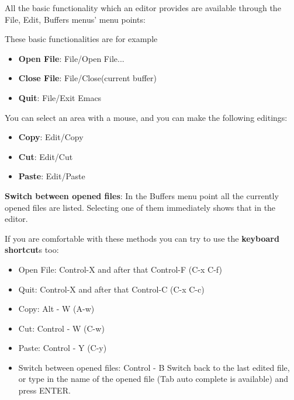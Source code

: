 \documentclass[12pt]{article}
\begin{document}
All the basic functionality which an editor provides are available through
the File, Edit, Buffers menus' menu points:

These basic functionalities are for example
\begin{itemize}
	\item {\bf Open File}: File/Open File...
	\item {\bf Close File}: File/Close(current buffer)
	\item {\bf Quit}: File/Exit Emacs
\end{itemize}


You can select an area with a mouse, and you can make the following editings:
\begin{itemize}
	\item {\bf Copy}: Edit/Copy
	\item {\bf Cut}: Edit/Cut
	\item {\bf Paste}: Edit/Paste
\end{itemize}

{\bf Switch between opened files}: In the Buffers menu point all the currently 
 opened files are listed. Selecting one of them immediately shows that in the 
 editor.

If you are comfortable with these methods you can try to use the {\bf keyboard 
shortcut}s too:
\begin{itemize}
	\item Open File: Control-X and after that Control-F (C-x C-f)
	\item Quit: Control-X and after that Control-C (C-x C-c)

	\item Copy: Alt - W (A-w)
	\item Cut: Control - W (C-w)
	\item Paste: Control - Y (C-y)

	\item Switch between opened files:
	Control - B Switch back to the last edited file, or type in the name of the 
	 opened file (Tab auto complete is available) and press ENTER.

\end{itemize}
\end{document}
